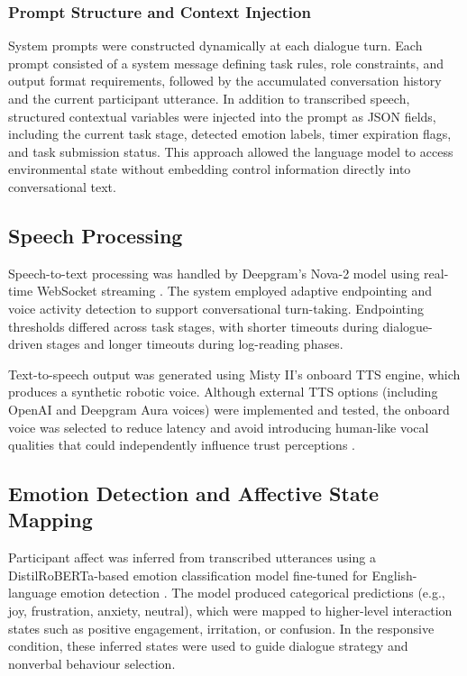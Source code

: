 \documentclass[
]{article}
\begin{document}
\subsubsection{Prompt Structure and Context
Injection}\label{prompt-structure-and-context-injection}

System prompts were constructed dynamically at each dialogue turn. Each
prompt consisted of a system message defining task rules, role
constraints, and output format requirements, followed by the accumulated
conversation history and the current participant utterance. In addition
to transcribed speech, structured contextual variables were injected
into the prompt as JSON fields, including the current task stage,
detected emotion labels, timer expiration flags, and task submission
status. This approach allowed the language model to access environmental
state without embedding control information directly into conversational
text.

\subsection{Speech Processing}\label{speech-processing}

Speech-to-text processing was handled by Deepgram's Nova-2 model using
real-time WebSocket streaming \autocite{deepgram}. The system employed
adaptive endpointing and voice activity detection to support
conversational turn-taking. Endpointing thresholds differed across task
stages, with shorter timeouts during dialogue-driven stages and longer
timeouts during log-reading phases.

Text-to-speech output was generated using Misty II's onboard TTS engine,
which produces a synthetic robotic voice. Although external TTS options
(including OpenAI and Deepgram Aura voices) were implemented and tested,
the onboard voice was selected to reduce latency and avoid introducing
human-like vocal qualities that could independently influence trust
perceptions \autocite{OpenAI2023ChatGPT}.

\subsection{Emotion Detection and Affective State
Mapping}\label{emotion-detection-and-affective-state-mapping}

Participant affect was inferred from transcribed utterances using a
DistilRoBERTa-based emotion classification model fine-tuned for
English-language emotion detection \autocite{sanh2019distilbert}. The
model produced categorical predictions (e.g., joy, frustration, anxiety,
neutral), which were mapped to higher-level interaction states such as
positive engagement, irritation, or confusion. In the responsive
condition, these inferred states were used to guide dialogue strategy
and nonverbal behaviour selection.
\end{document}
